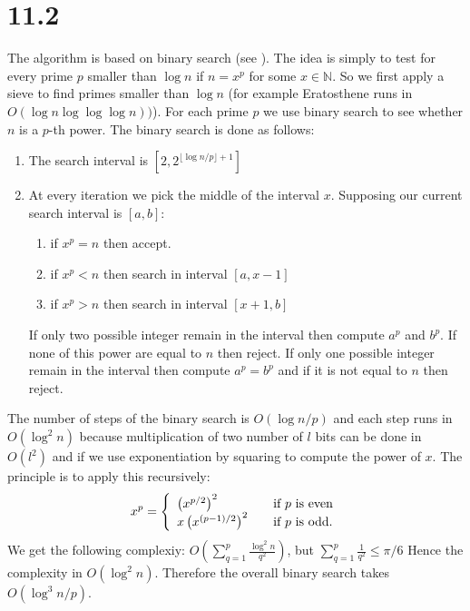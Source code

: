 \documentclass[12pt,a4paper]{article}
\begin{document}
    \section{11.2}
        The algorithm is based on binary search (see \cite{power}). The idea is simply to test for every prime $p$ smaller than $\log n$ if $n = x^p$ for some $x\in \mathbb{N}$.
        So we first apply a sieve to find primes smaller than $\log n$ (for example Eratosthene runs in $O(\log n \log\log\log n))$). For each prime $p$
        we use binary search to see whether $n$ is a $p$-th power. The binary search is done as follows:
        \begin{enumerate}
            \item The search interval is $[2,2^{\lfloor \log n / p \rfloor + 1}]$
            \item At every iteration we pick the middle of the interval $x$. Supposing our current search interval is $[a,b]$:
                \begin{enumerate}
                    \item if $x^p = n$ then accept.
                    \item if $x^p < n$ then search in interval $[a,x-1]$
                    \item if $x^p > n$ then search in interval $[x+1,b]$
                \end{enumerate}
                If only two possible integer remain in the interval then compute $a^p$ and $b^p$. If none of this power are equal to $n$ then reject.
                If only one possible integer remain in the interval then compute $a^p = b^p$ and if it is not equal to $n$ then reject.
        \end{enumerate}
        The number of steps of the binary search is $O(\log n / p)$ and each step runs in $O(\log^2n)$ because multiplication of two number of $l$ bits can be done in $O(l^2)$
        and if we use exponentiation by squaring to compute the power of $x$. The principle is to apply this recursively:
        \[
            x^p = \left\{ 
                \begin{array}{l l}
                    \left(x^{p/2}\right)^2 & \quad\mbox{if $p$ is even}\\
               x\left(x^{(p-1)/2}\right)^2 & \quad\mbox{if $p$ is odd.}\\
                \end{array}\right.
        \]
        We get the following complexiy: $O(\sum_{q=1}^{p}\frac{\log^2n}{q^2})$, but $\sum_{q=1}^{p}\frac{1}{q^2} \leq \pi/6$
        Hence the complexity in $O(\log^2n)$.
        Therefore the overall binary search takes $O(\log^3n/p)$.
\end{document}
